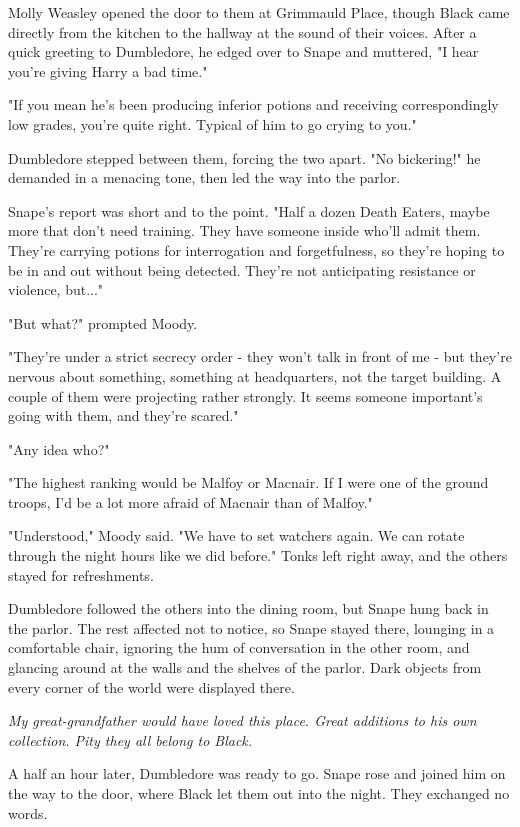 Molly Weasley opened the door to them at Grimmauld Place, though Black came directly from the kitchen to the hallway at the sound of their voices. After a quick greeting to Dumbledore, he edged over to Snape and muttered, "I hear you're giving Harry a bad time."

"If you mean he's been producing inferior potions and receiving correspondingly low grades, you're quite right. Typical of him to go crying to you."

Dumbledore stepped between them, forcing the two apart. "No bickering!" he demanded in a menacing tone, then led the way into the parlor.

Snape's report was short and to the point. "Half a dozen Death Eaters, maybe more that don't need training. They have someone inside who'll admit them. They're carrying potions for interrogation and forgetfulness, so they're hoping to be in and out without being detected. They're not anticipating resistance or violence, but..."

"But what?" prompted Moody.

"They're under a strict secrecy order - they won't talk in front of me - but they're nervous about something, something at headquarters, not the target building. A couple of them were projecting rather strongly. It seems someone important's going with them, and they're scared."

"Any idea who?"

"The highest ranking would be Malfoy or Macnair. If I were one of the ground troops, I'd be a lot more afraid of Macnair than of Malfoy."

"Understood," Moody said. "We have to set watchers again. We can rotate through the night hours like we did before." Tonks left right away, and the others stayed for refreshments.

Dumbledore followed the others into the dining room, but Snape hung back in the parlor. The rest affected not to notice, so Snape stayed there, lounging in a comfortable chair, ignoring the hum of conversation in the other room, and glancing around at the walls and the shelves of the parlor. Dark objects from every corner of the world were displayed there.

\emph{My great-grandfather would have loved this place. Great additions to his own collection. Pity they all belong to Black.}

A half an hour later, Dumbledore was ready to go. Snape rose and joined him on the way to the door, where Black let them out into the night. They exchanged no words.

